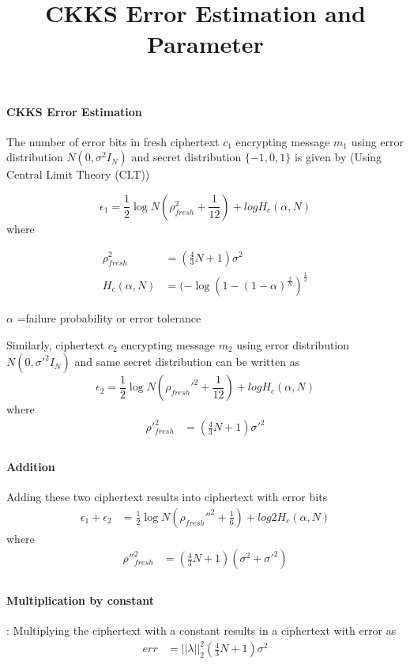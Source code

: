 \documentclass[a4paper,10pt]{article}
\title{CKKS Error Estimation and Parameter}
\author{}
\date{}
\begin{document}
\maketitle

\paragraph{CKKS Error Estimation}
The number of error bits in fresh ciphertext $c_1$ encrypting message $m_1$ using error distribution $N(0,\sigma^2 I_N)$ and secret distribution $\{-1,0,1\}$ is given by (Using Central Limit Theory (CLT))

\begin{equation}
 \epsilon_1 = \frac{1}{2}\log N(\rho_{fresh}^2+\frac{1}{12}) + log H_c (\alpha,N)
\end{equation}
where

\begin{align*}
    \rho^2_{fresh}&=(\frac{4}{3}N+1)\sigma^2 \\
    H_c (\alpha,N)&=(-\log (1-(1-\alpha)^\frac{2}{N})^\frac{1}{2}
\end{align*}

$\alpha$ =failure probability or error tolerance

Similarly, ciphertext $c_2$ encrypting message $m_2$ using error distribution $N(0,\sigma'^2 I_N)$ and same secret distribution can be written as
\begin{equation}
 \epsilon_2 = \frac{1}{2}\log N(\rho_{fresh}'^2+\frac{1}{12}) + log H_c (\alpha,N)
\end{equation}
where
\begin{align*}
    \rho'^2_{fresh}&=(\frac{4}{3}N+1)\sigma'^2 \\
\end{align*}

\paragraph{Addition} Adding these two ciphertext results into ciphertext with error bits
\begin{align}
  \epsilon_1+\epsilon_2 &= \frac{1}{2}\log N(\rho_{fresh}''^2+\frac{1}{6}) + log 2H_c (\alpha,N)
\end{align}
where
\begin{align*}
    \rho''^2_{fresh}&=(\frac{4}{3}N+1)(\sigma^2+\sigma'^2) \\
\end{align*}

\paragraph{Multiplication by constant}: Multiplying the ciphertext with a constant results in a ciphertext with error as
\begin{align}
    err &= ||\lambda||^2_2(\frac{4}{3}N+1)\sigma^2
\end{align}
\end{document}
